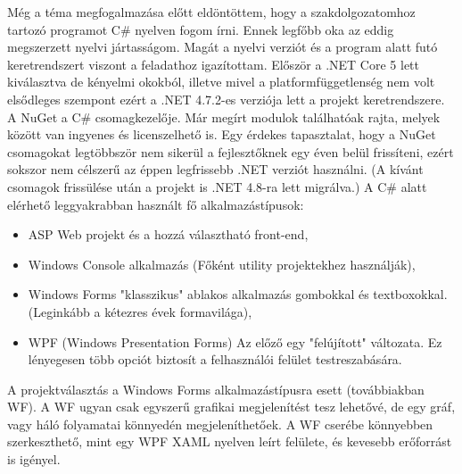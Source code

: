 

Még a téma megfogalmazása előtt eldöntöttem, hogy a szakdolgozatomhoz tartozó programot C\# nyelven fogom írni. Ennek legfőbb oka az eddig megszerzett nyelvi jártasságom. Magát a nyelvi verziót és a program alatt futó keretrendszert viszont a feladathoz igazítottam. Először a .NET Core 5 lett kiválasztva de kényelmi okokból, illetve mivel a platformfüggetlenség nem volt elsődleges szempont ezért  a .NET 4.7.2-es verziója lett a projekt keretrendszere. A NuGet a C\# csomagkezelője. Már megírt modulok találhatóak rajta, melyek között van ingyenes és licenszelhető is. Egy érdekes tapasztalat, hogy a NuGet csomagokat legtöbbször nem sikerül a fejlesztőknek egy éven belül frissíteni, ezért sokszor nem célszerű az éppen legfrissebb .NET verziót használni. (A kívánt csomagok frissülése után a projekt is .NET 4.8-ra lett migrálva.) A C\# alatt elérhető leggyakrabban használt fő alkalmazástípusok:
\begin{itemize}
\item ASP Web projekt és a hozzá választható front-end,\\
\item Windows Console alkalmazás (Főként utility projektekhez használják),
\item Windows Forms "klasszikus" ablakos alkalmazás gombokkal és textboxokkal. (Leginkább a kétezres évek formavilága),
\item WPF (Windows Presentation Forms) Az előző egy "felújított" változata. Ez lényegesen több opciót biztosít a felhasználói felület testreszabására.
\end{itemize}

A projektválasztás a Windows Forms alkalmazástípusra esett (továbbiakban WF). A WF ugyan csak egyszerű grafikai megjelenítést tesz lehetővé, de egy gráf, vagy háló folyamatai könnyedén megjeleníthetőek. A WF cserébe könnyebben szerkeszthető, mint egy WPF XAML nyelven leírt felülete, és kevesebb erőforrást is igényel. 
\newpage
{}
